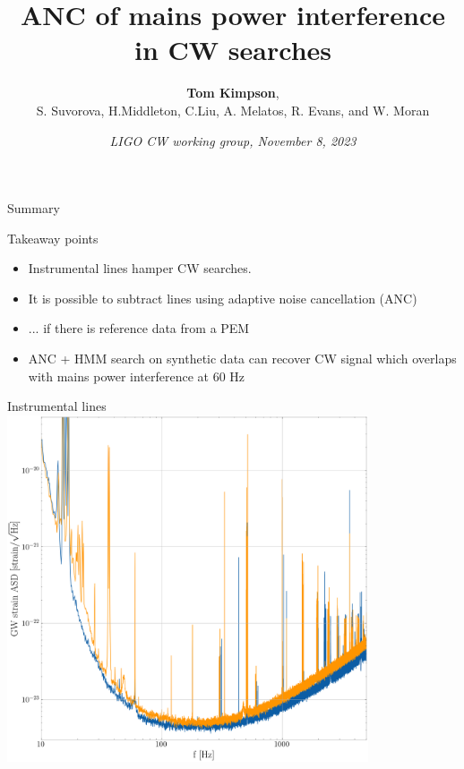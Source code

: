 \documentclass[10pt]{beamer}
\title{ANC of mains power interference in CW searches}
\subtitle{}
\author{\textbf{Tom Kimpson}, \\ S. Suvorova, H.Middleton, C.Liu,  A. Melatos, R. Evans, and W. Moran}
\date{\textit{LIGO CW working group, November 8, 2023}}
\newcommand\extrafootertext[1]{%
	\bgroup
	\renewcommand\thefootnote{\fnsymbol{footnote}}%
	\renewcommand\thempfootnote{\fnsymbol{mpfootnote}}%
	\footnotetext[0]{#1}%
	\egroup
}
\begin{document}
	
	\maketitle
	
	\begin{frame}{Summary}
		
		\begin{block}{\alert{Takeaway points}}
			\begin{itemize}
				\item Instrumental lines hamper CW searches.
				\item It is possible to subtract lines using adaptive noise cancellation (ANC) 
				\item ... if there is reference data from a PEM
				\item ANC + HMM search on synthetic data can recover CW signal which overlaps with mains power interference at 60 Hz
			\end{itemize}
		\end{block}
		
	\end{frame}


\begin{frame}{Instrumental lines}
	\centering
	\includegraphics[width=0.8\textwidth,height=0.7\textwidth]{images/sensitivity_sq}
	
	
\end{frame}


	
%	
%	
%
%	
%	
\end{document}
